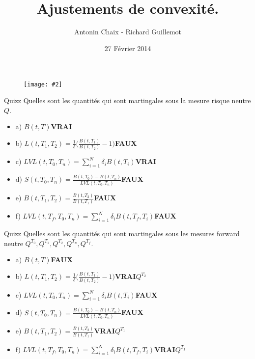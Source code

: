 \documentclass{beamer}
\title[Produits dérivés de taux]{Ajustements de convexité. }
\author{Antonin Chaix - Richard Guillemot}
\institute{Master IFMA}
\date{27 Février 2014}
\newcommand{\FIG}[2]{\texttt{[image: \#2]}}
\begin{document}
\begin{frame}
\titlepage
\begin{figure}[h]
\centering \FIG{5cm}{figures/UPMC_IFMA.jpg}
\end{figure}
\end{frame}

\begin{frame}{Quizz}
Quelles sont les quantités qui sont martingales sous la mesure risque neutre $Q$.
\begin{itemize}
\item a) $B(t,T)$\textbf{\color{green}VRAI} 
\item b) $L(t,T_1,T_2)=\frac{1}{\delta}\big(\frac{B(t,T_1)}{B(t,T_2)}-1 \big)$\textbf{\color{red}FAUX}
\item c) $\displaystyle LVL(t,T_0,T_n)=\sum_{i=1}^{N}\delta_i B(t,T_i)$\textbf{\color{green}VRAI}
\item d) $S(t,T_0,T_n)=\frac{B(t,T_0)-B(t,T_n)}{LVL(t,T_0,T_n)}$\textbf{\color{red}FAUX}
\item e) $B(t,T_1,T_2)=\frac{B(t,T_2)}{B(t,T_1)}$\textbf{\color{red}FAUX} 
\item f) $\displaystyle LVL(t,T_f,T_0,T_n)=\sum_{i=1}^{N}\delta_i B(t,T_f,T_i)$\textbf{\color{red}FAUX}
\end{itemize}
\end{frame}


\begin{frame}{Quizz}
Quelles sont les quantités qui sont martingales sous les mesures forward neutre $Q^{T_0}, Q^{T_1},Q^{T_2}, Q^{T_n}, Q^{T_f}$.
\begin{itemize}
\item a) $B(t,T)$\textbf{\color{red}FAUX}
\item b) $L(t,T_1,T_2)=\frac{1}{\delta}\big(\frac{B(t,T_1)}{B(t,T_2)}-1 \big)$\textbf{\color{green}VRAI}$Q^{T_2}$
\item c) $\displaystyle LVL(t,T_0,T_n)=\sum_{i=1}^{N}\delta_i B(t,T_i)$\textbf{\color{red}FAUX}
\item d) $S(t,T_0,T_n)=\frac{B(t,T_0)-B(t,T_n)}{LVL(t,T_0,T_n)}$\textbf{\color{red}FAUX}
\item e) $B(t,T_1,T_2)=\frac{B(t,T_2)}{B(t,T_1)}$\textbf{\color{green}VRAI}$Q^{T_1}$ 
\item f) $\displaystyle LVL(t,T_f,T_0,T_n)=\sum_{i=1}^{N}\delta_i B(t,T_f,T_i)$\textbf{\color{green}VRAI}$Q^{T_f}$
\end{itemize}
\end{frame}
\end{document}

